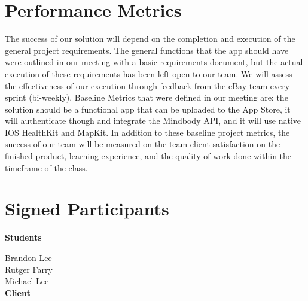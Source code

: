 \documentclass[letterpaper,10pt,titlepage]{article}
\begin{document}
\section{Performance Metrics}

The success of our solution will depend on the completion and execution of the general project requirements. The general functions that the app should have were outlined in our meeting with a basic requirements document, but the actual execution of these requirements has been left open to our team. We will assess the effectiveness of our execution through feedback from the eBay team every sprint (bi-weekly). Baseline Metrics that were defined in our meeting are: the solution should be a functional app that can be uploaded to the App Store, it will authenticate though and integrate the Mindbody API, and it will use native IOS HealthKit and MapKit. In addition to these baseline project metrics, the success of our team will be measured on the team-client satisfaction on the finished product, learning experience, and the quality of work done within the timeframe of the class.

\newpage

\section{Signed Participants}

\textbf{Students}

Brandon Lee\\
Rutger Farry\\
Michael Lee\\

\textbf{Client}
\end{document}
